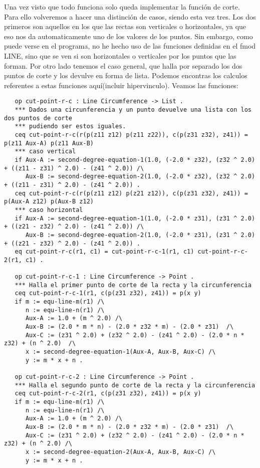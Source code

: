 \documentclass[12pt,a4paper]{book}
\begin{document}
Una vez visto que todo funciona solo queda implementar la funci\'on de corte. Para ello volveremos a hacer una distinci\'on de casos, siendo esta vez tres. Los dos primeros son aquellos en los que las rectas son verticales o horizontales, ya que eso nos da automaticamente uno de los valores de los puntos. Sin embargo, como puede verse en el programa, no he hecho uso de las funciones definidas en el fmod LINE, sino que se ven si son horizontales o verticales por los puntos que las forman. Por otro lado tenemos el caso general, que halla por separado los dos puntos de corte y los devulve en forma de lista. Podemos encontras los calculos referentes a estas funciones aqu\'i(incluir hipervinculo). Veamos las funciones:

\begin{verbatim}
   op cut-point-r-c : Line Circumference -> List .
   *** Dados una circunferencia y un punto devuelve una lista con los dos puntos de corte
   *** pudiendo ser estos iguales.
   ceq cut-point-r-c(r(p(z11 z12) p(z11 z22)), c(p(z31 z32), z41)) = p(z11 Aux-A) p(z11 Aux-B)
   *** caso vertical 
   if Aux-A := second-degree-equation-1(1.0, (-2.0 * z32), (z32 ^ 2.0) + ((z11 - z31) ^ 2.0) - (z41 ^ 2.0)) /\
      Aux-B := second-degree-equation-2(1.0, (-2.0 * z32), (z32 ^ 2.0) + ((z11 - z31) ^ 2.0) - (z41 ^ 2.0)) .
   ceq cut-point-r-c(r(p(z11 z12) p(z21 z12)), c(p(z31 z32), z41)) = p(Aux-A z12) p(Aux-B z12)
   *** caso horizontal
   if Aux-A := second-degree-equation-1(1.0, (-2.0 * z31), (z31 ^ 2.0) + ((z21 - z32) ^ 2.0) - (z41 ^ 2.0)) /\
      Aux-B := second-degree-equation-2(1.0, (-2.0 * z31), (z31 ^ 2.0) + ((z21 - z32) ^ 2.0) - (z41 ^ 2.0)) .
   eq cut-point-r-c(r1, c1) = cut-point-r-c-1(r1, c1) cut-point-r-c-2(r1, c1) .

   op cut-point-r-c-1 : Line Circumference -> Point .
   *** Halla el primer punto de corte de la recta y la circunferencia
   ceq cut-point-r-c-1(r1, c(p(z31 z32), z41)) = p(x y)
   if m := equ-line-m(r1) /\
      n := equ-line-n(r1) /\
      Aux-A := 1.0 + (m ^ 2.0) /\
      Aux-B := (2.0 * m * n) - (2.0 * z32 * m) - (2.0 * z31)  /\
      Aux-C := (z31 ^ 2.0) + (z32 ^ 2.0) - (z41 ^ 2.0) - (2.0 * n * z32) + (n ^ 2.0)  /\
      x := second-degree-equation-1(Aux-A, Aux-B, Aux-C) /\
      y := m * x + n .

   op cut-point-r-c-2 : Line Circumference -> Point .
   *** Halla el segundo punto de corte de la recta y la circunferencia
   ceq cut-point-r-c-2(r1, c(p(z31 z32), z41)) = p(x y)
   if m := equ-line-m(r1) /\
      n := equ-line-n(r1) /\
      Aux-A := 1.0 + (m ^ 2.0) /\
      Aux-B := (2.0 * m * n) - (2.0 * z32 * m) - (2.0 * z31)  /\
      Aux-C := (z31 ^ 2.0) + (z32 ^ 2.0) - (z41 ^ 2.0) - (2.0 * n * z32) + (n ^ 2.0) /\
      x := second-degree-equation-2(Aux-A, Aux-B, Aux-C) /\
      y := m * x + n .

\end{verbatim}
\end{document}
